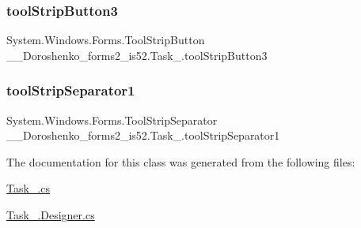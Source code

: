 \hypertarget{class__7___doroshenko__forms2__is52_1_1_task__3_ac3829d4753dd356088f5b0934ed9a168}{}\label{class__7___doroshenko__forms2__is52_1_1_task__3_ac3829d4753dd356088f5b0934ed9a168} 
\subsubsection{\texorpdfstring{tool\+Strip\+Button3}{toolStripButton3}}
{\footnotesize\ttfamily System.\+Windows.\+Forms.\+Tool\+Strip\+Button \+\_\+\_\+\+Doroshenko\+\_\+forms2\+\_\+is52.\+Task\+\_.\+tool\+Strip\+Button3\hspace{0.3cm}{\ttfamily [protected]}}

\hypertarget{class__7___doroshenko__forms2__is52_1_1_task__3_a76bb1982fc89d07002bd756087639c6f}{}\label{class__7___doroshenko__forms2__is52_1_1_task__3_a76bb1982fc89d07002bd756087639c6f} 
\subsubsection{\texorpdfstring{tool\+Strip\+Separator1}{toolStripSeparator1}}
{\footnotesize\ttfamily System.\+Windows.\+Forms.\+Tool\+Strip\+Separator \+\_\+\_\+\+Doroshenko\+\_\+forms2\+\_\+is52.\+Task\+\_.\+tool\+Strip\+Separator1\hspace{0.3cm}{\ttfamily [private]}}



The documentation for this class was generated from the following files\+:\begin{DoxyCompactItemize}
\item 
\hyperlink{_task__3_8cs}{Task\+\_.\+cs}\item 
\hyperlink{_task__3_8_designer_8cs}{Task\+\_.\+Designer.\+cs}\end{DoxyCompactItemize}

